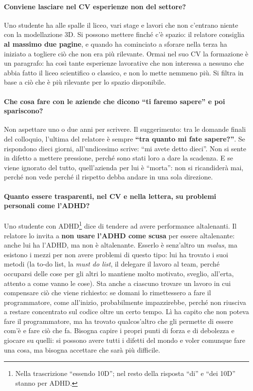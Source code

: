 \paragraph{Conviene lasciare nel CV esperienze non del settore?} Uno studente ha alle spalle il liceo, vari stage e
lavori che non c'entrano niente con la modellazione 3D. Si possono mettere finché c'è spazio: il relatore consiglia
\textbf{al massimo due pagine}, e quando ha cominciato a sforare nella terza ha iniziato a togliere ciò che non era più
rilevante. Ormai nel suo CV la formazione è un paragrafo: ha così tante esperienze lavorative che non interessa a nessuno
che abbia fatto il liceo scientifico o classico, e non lo mette nemmeno più. Si filtra in base a ciò che è più rilevante
per lo spazio disponibile.

\paragraph{Che cosa fare con le aziende che dicono ``ti faremo sapere'' e poi spariscono?} Non aspettare uno o due anni
per scrivere. Il suggerimento: tra le domande finali del colloquio, l'ultima del relatore è sempre \textbf{``tra quanto
mi fate sapere?''}. Se rispondono dieci giorni, all'undicesimo scrive: ``mi avete detto dieci''. Non si sente in difetto a
mettere pressione, perché sono stati loro a dare la scadenza. E se viene ignorato del tutto, quell'azienda per lui è
``morta'': non si ricandiderà mai, perché non vede perché il rispetto debba andare in una sola direzione.

\paragraph{Quanto essere trasparenti, nel CV e nella lettera, su problemi personali come l'ADHD?} Uno studente con
ADHD\footnote{Nella trascrizione ``essendo 10D''; nel resto della risposta ``di'' e ``dei 10D'' stanno per ADHD.} dice di
tendere ad avere performance altalenanti. Il relatore lo invita a \textbf{non usare l'ADHD come scusa} per essere
altalenante: anche lui ha l'ADHD, ma non è altalenante. Esserlo è senz'altro un \emph{malus}, ma esistono i mezzi per non
avere problemi di questo tipo: lui ha trovato i suoi metodi (la to-do list, la \emph{must do list}, il delegare il lavoro
al team, perché occuparsi delle cose per gli altri lo mantiene molto motivato, sveglio, all'erta, attento a come vanno le
cose). Sta anche a ciascuno trovare un lavoro in cui compensare ciò che viene richiesto: se domani lo rimettessero a fare
il programmatore, come all'inizio, probabilmente impazzirebbe, perché non riusciva a restare concentrato sul codice oltre
un certo tempo. Lì ha capito che non poteva fare il programmatore, ma ha trovato qualcos'altro che gli permette di essere
com'è e fare ciò che fa. Bisogna capire i propri punti di forza e di debolezza e giocare su quelli: si possono avere tutti
i difetti del mondo e voler comunque fare una cosa, ma bisogna accettare che sarà più difficile.

